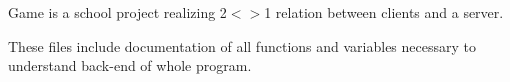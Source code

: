 Game is a school project realizing 2$<$$>$1 relation between clients and a server.

These files include documentation of all functions and variables necessary to understand back-\/end of whole program. 